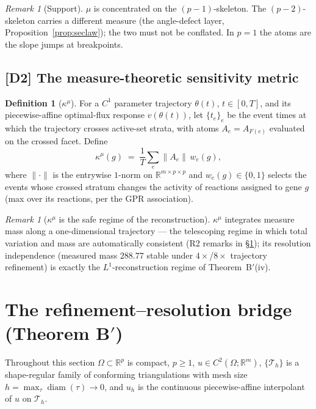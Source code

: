 \documentclass[11pt,a4paper]{article}
\theoremstyle{plain}
\theoremstyle{definition}
\newtheorem{definition}[theorem]{Definition}
\theoremstyle{remark}
\newtheorem{remark}[theorem]{Remark}
\newcommand{\kmu}{\kappa^{\mu}}
\newcommand{\RR}{\mathbb{R}}
\begin{document}
\begin{remark}[Support]\label{rem:support}
$\mu$ is concentrated on the $(p-1)$-skeleton. The $(p-2)$-skeleton carries
a different measure (the angle-defect layer,
Proposition~\ref{prop:seclaw}); the two must not be conflated. In $p=1$ the
atoms are the slope jumps at breakpoints.
\end{remark}

\subsection{[D2] The measure-theoretic sensitivity metric}

\begin{definition}[$\kmu$]\label{def:kmu}
For a $C^1$ parameter trajectory $\theta(t)$, $t \in [0,T]$, and its
piecewise-affine optimal-flux response $v(\theta(t))$, let
$\{t_e\}_e$ be the event times at which the trajectory crosses active-set
strata, with atoms $A_e = A_{F(e)}$ evaluated on the crossed facet. Define
\[
\kmu(g) \;=\; \frac{1}{T}\sum_{e} \bigl\| A_e \bigr\| \, w_e(g),
\]
where $\|{\cdot}\|$ is the entrywise $1$-norm on
$\RR^{m \times p \times p}$ and $w_e(g) \in \{0,1\}$ selects the events
whose crossed stratum changes the activity of reactions assigned to gene
$g$ (max over its reactions, per the GPR association).
\end{definition}

\begin{remark}[$\kmu$ is the safe regime of the reconstruction]
$\kmu$ integrates measure mass along a one-dimensional trajectory --- the
telescoping regime in which total variation and mass are automatically
consistent (R2 remarks in \S\ref{sec:theoremB}); its resolution
independence (measured mass $288.77$ stable under $4\times$/$8\times$
trajectory refinement) is exactly the $L^1$-reconstruction regime of
Theorem~B$'$(iv).
\end{remark}

\section{The refinement--resolution bridge (Theorem B$'$)}
\label{sec:theoremB}

Throughout this section $\Omega \subset \RR^p$ is compact, $p \ge 1$,
$u \in C^2(\Omega; \RR^m)$, $\{\mathcal{T}_h\}$ is a shape-regular family
of conforming triangulations with mesh size
$h = \max_\tau \operatorname{diam}(\tau) \to 0$, and $u_h$ is the
continuous piecewise-affine interpolant of $u$ on $\mathcal{T}_h$.
\end{document}
